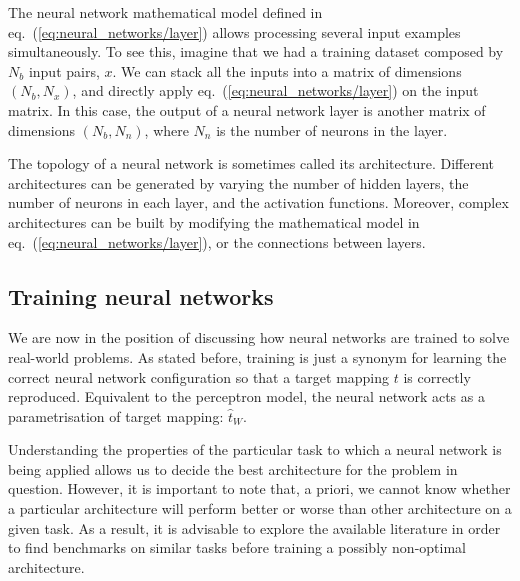 The neural network mathematical model defined in eq.~(\ref{eq:neural_networks/layer}) allows processing
several input examples simultaneously. To see this, imagine that we had a training dataset composed by $N_b$
input pairs, $x$. We can stack all the inputs into a matrix of dimensions $(N_b, N_x)$, and directly apply
eq.~(\ref{eq:neural_networks/layer}) on the input matrix. In this case, the output of a neural network layer
is another matrix of dimensions $(N_b, N_n)$, where $N_n$ is the number of neurons in the layer.
 
The topology of a neural network is sometimes called its architecture. Different architectures can be
generated by varying the number of hidden layers, the number of neurons in each layer, and the activation
functions. Moreover, complex architectures can be built by modifying the mathematical model in
eq.~(\ref{eq:neural_networks/layer}), or the connections between layers.
 
\subsection{Training neural networks}
We are now in the position of discussing how neural networks are trained to solve real-world problems. As
stated before, training is just a synonym for learning the correct neural network configuration so that a
target mapping $t$ is correctly reproduced. Equivalent to the perceptron model, the neural network acts as a
parametrisation of target mapping: $\hat{t}_W$.

Understanding the properties of the particular task to which a neural network is being applied allows us to
decide the best architecture for the problem in question. However, it is important to note that, a priori, we
cannot know whether a particular architecture will perform better or worse than other architecture on a given
task. As a result, it is advisable to explore the available literature in order to find benchmarks on similar
tasks before training a possibly non-optimal architecture.

